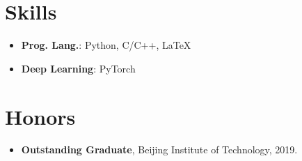 \documentclass[letterpaper,11pt]{article}
\newcommand{\resumeSubHeadingListStart}{\begin{itemize}[leftmargin=*]}
\newcommand{\resumeSubHeadingListEnd}{\end{itemize}}
\begin{document}
%
\section{Skills}
 \resumeSubHeadingListStart
   \item \textbf{Prog. Lang.}{: Python, C/C++, \LaTeX \vspace{-2pt}}
   \item \textbf{Deep Learning}{: PyTorch \vspace{-2pt}}
 \resumeSubHeadingListEnd


\section{Honors}
 \resumeSubHeadingListStart
   \item \textbf{Outstanding Graduate}, Beijing Institute of Technology, 2019. \vspace{-2pt}
 \resumeSubHeadingListEnd


\end{document}
